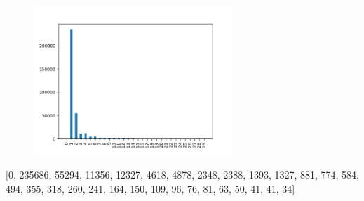 \documentclass[10pt, conference, compsocconf]{IEEEtran}
\begin{document}
\begin{figure}[H]\centering\includegraphics[width=75mm,scale=0.5]{BasedonClientIDcookiedis}\end{figure}[0, 235686, 55294, 11356, 12327, 4618, 4878, 2348, 2388, 1393, 1327, 881, 774, 584, 494, 355, 318, 260, 241, 164, 150, 109, 96, 76, 81, 63, 50, 41, 41, 34]
\end{document}

